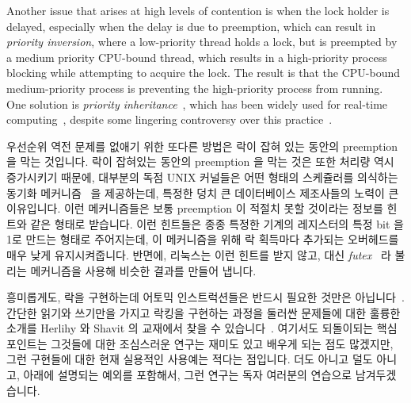 Another issue that arises at high levels of contention is when the
lock holder is delayed, especially when the delay is due to
preemption, which can result in \emph{priority inversion},
where a low-priority thread holds a lock, but is preempted
by a medium priority CPU-bound thread, which results in
a high-priority process blocking while attempting to acquire the
lock.
The result is that the CPU-bound medium-priority process is preventing the
high-priority process from running.
One solution is \emph{priority inheritance}~\cite{Lampson1980Mesa},
which has been widely used for real-time
computing~\cite{Sha1990IEEETransComp,JonathanCorbet2006PriorityInheritance},
despite some lingering controversy over this
practice~\cite{Yodaiken2004FSM,DougLocke2002a}.
\fi

우선순위 역전 문제를 없애기 위한 또다른 방법은 락이 잡혀 있는 동안의 preemption
을 막는 것입니다.
락이 잡혀있는 동안의 preemption 을 막는 것은 또한 처리량 역시 증가시키기
때문에, 대부분의 독점 UNIX 커널들은 어떤 형태의 스케쥴러를 의식하는 동기화
메커니즘~\cite{Kontothanassis97a} 을 제공하는데, 특정한 덩치 큰 데이터베이스
제조사들의 노력이 큰 이유입니다.
이런 메커니즘들은 보통 preemption 이 적절치 못할 것이라는 정보를 힌트와 같은
형태로 받습니다.
이런 힌트들은 종종 특정한 기계의 레지스터의 특정 bit 을 1로 만드는 형태로
주어지는데, 이 메커니즘을 위해 락 획득마다 추가되는 오버헤드를 매우 낮게
유지시켜줍니다.
반면에, 리눅스는 이런 힌트를 받지 않고, 대신
\emph{futex}~\cite{HubertusFrancke2002Futex,IngoMolnar2006RobustFutexes,StevenRostedt2006piFutexes,UlrichDrepper2011Futexes}
라 불리는 메커니즘을 사용해 비슷한 결과를 만들어 냅니다.

흥미롭게도, 락을 구현하는데 어토믹 인스트럭션들은 반드시 필요한 것만은
아닙니다~\cite{Dijkstra65a,Lamport74a}.
간단한 읽기와 쓰기만을 가지고 락킹을 구현하는 과정을 둘러싼 문제들에 대한
훌륭한 소개를 Herlihy 와 Shavit 의 교재에서 찾을 수
있습니다~\cite{HerlihyShavit2008Textbook}.
여기서도 되돌이되는 핵심 포인트는 그것들에 대한 조심스러운 연구는 재미도 있고
배우게 되는 점도 많겠지만, 그런 구현들에 대한 현재 실용적인 사용예는 적다는
점입니다.
더도 아니고 덜도 아니고, 아래에 설명되는 예외를 포함해서, 그런 연구는 독자
여러분의 연습으로 남겨두겠습니다.

